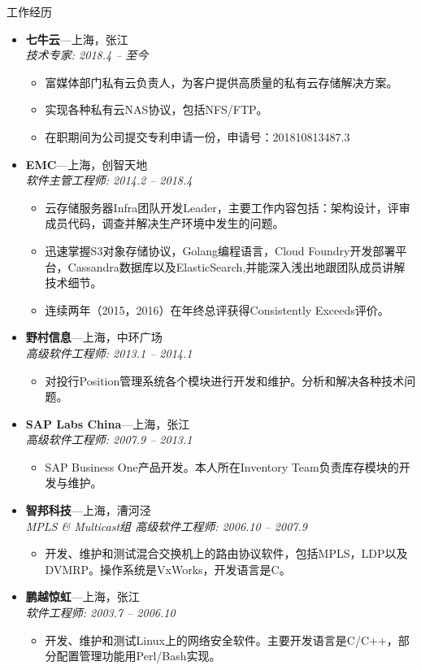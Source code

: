 \documentclass[11pt,oneside]{article}
\newenvironment{ressection}[1]{
	\vspace{4pt}
	{\selectfont\Large#1}
	\begin{itemize}
	\vspace{3pt}
}{
	\end{itemize}
}
\newcommand{\ressubitem}[1]{
	\vspace{-1pt}
	\item \begin{flushleft} #1 \end{flushleft}
}
\newcommand{\resbigitem}[3]{
	\vspace{-5pt}
	\item
	\textbf{#1}---#2 \\
	\textit{#3}
}
\newenvironment{ressubsec}[3]{
	\resbigitem{#1}{#2}{#3}
	\vspace{-2pt}
	\begin{itemize}
}{
    \end{itemize}
}
\begin{document}
\begin{ressection}{工作经历}

	\begin{ressubsec}{七牛云}{上海，张江}{技术专家: 2018.4 -- 至今}
		\ressubitem{富媒体部门私有云负责人，为客户提供高质量的私有云存储解决方案。}
		\ressubitem{实现各种私有云NAS协议，包括NFS/FTP。}
		\ressubitem{在职期间为公司提交专利申请一份，申请号：201810813487.3}
	\end{ressubsec}

	\begin{ressubsec}{EMC}{上海，创智天地}{软件主管工程师: 2014.2 -- 2018.4}
		\ressubitem{云存储服务器Infra团队开发Leader，主要工作内容包括：架构设计，评审成员代码，调查并解决生产环境中发生的问题。}
		\ressubitem{迅速掌握S3对象存储协议，Golang编程语言，Cloud Foundry开发部署平台，Cassandra数据库以及ElasticSearch,并能深入浅出地跟团队成员讲解技术细节。}
		\ressubitem{连续两年（2015，2016）在年终总评获得Consistently Exceeds评价。}
	\end{ressubsec}

	\begin{ressubsec}{野村信息}{上海，中环广场}{高级软件工程师: 2013.1 -- 2014.1}
		\ressubitem{对投行Position管理系统各个模块进行开发和维护。分析和解决各种技术问题。}
	\end{ressubsec}

	\begin{ressubsec}{SAP Labs China}{上海，张江}{高级软件工程师: 2007.9 -- 2013.1}
		\ressubitem{SAP Business One产品开发。本人所在Inventory Team负责库存模块的开发与维护。}
	\end{ressubsec}

	\begin{ressubsec}{智邦科技}{上海，漕河泾}{MPLS \& Multicast组 高级软件工程师: 2006.10 -- 2007.9}
		\ressubitem{开发、维护和测试混合交换机上的路由协议软件，包括MPLS，LDP以及DVMRP。操作系统是VxWorks，开发语言是C。}
	\end{ressubsec}

	\begin{ressubsec}{鹏越惊虹}{上海，张江}{软件工程师: 2003.7 -- 2006.10}
		\ressubitem{开发、维护和测试Linux上的网络安全软件。主要开发语言是C/C++，部分配置管理功能用Perl/Bash实现。}
	\end{ressubsec}

\end{ressection}
\end{document}
